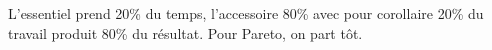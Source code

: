 %
    {L’essentiel prend 20\% du temps, l’accessoire 80\% avec pour corollaire 20\% du travail produit 80\% du résultat.}%
    {Pour Pareto, on part tôt.}
